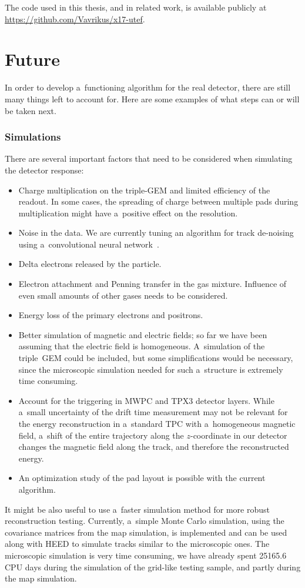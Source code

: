 		The code used in this thesis, and in related work, is available publicly at \url{https://github.com/Vavrikus/x17-utef}.
	\section*{Future}
		In order to develop a~functioning algorithm for the real detector, there are still many things left to account for. Here are some examples of what steps can or will be taken next.
		
	\subsubsection*{Simulations}
		There are several important factors that need to be considered when simulating the detector response:
		\begin{itemize}
			\item Charge multiplication on the triple-\ac{GEM} and limited efficiency of the readout. In some cases, the spreading of charge between multiple pads during multiplication might have a~positive effect on the resolution.
			\item Noise in the data. We are currently tuning an algorithm for track de-noising using a~convolutional neural network~\cite{Gajdoš_2025}.
			\item Delta electrons released by the particle.
			\item Electron attachment and Penning transfer in the gas mixture. Influence of even small amounts of other gases needs to be considered.
			\item Energy loss of the primary electrons and positrons.
			\item Better simulation of magnetic and electric fields; so far we have been assuming that the electric field is homogeneous. A~simulation of the triple~\ac{GEM} could be included, but some simplifications would be necessary, since the microscopic simulation needed for such a~structure is extremely time consuming.
			\item Account for the triggering in \ac{MWPC} and \acf{TPX3} detector layers. While a~small uncertainty of the drift time measurement may not be relevant for the energy reconstruction in a~standard \ac{TPC} with a~homogeneous magnetic field, a~shift of the entire trajectory along the $z$\nobreakdash-coordinate in our detector changes the magnetic field along the track, and therefore the reconstructed energy.
			\item An optimization study of the pad layout is possible with the current algorithm.
		\end{itemize}
		It might be also useful to use a~faster simulation method for more robust reconstruction testing. Currently, a~simple Monte Carlo simulation, using the covariance matrices from the map simulation, is implemented and can be used along with \ac{HEED} to simulate tracks similar to the microscopic ones. The microscopic simulation is very time consuming, we have already spent \num{25165.6} CPU days during the simulation of the grid-like testing sample, and partly during the map simulation.
		
